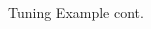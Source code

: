 \begin{frame}{Tuning Example cont.}
\begin{columns}
\begin{column}{0.6\textwidth}
\begin{figure}
  \end{figure}
\end{column}
\end{columns}


\end{frame}

